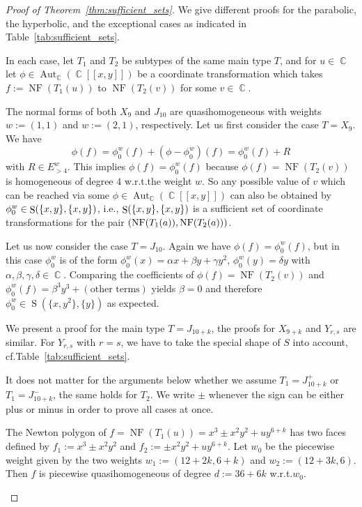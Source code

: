 \documentclass{amsproc}
\theoremstyle{definition}
\let\originalleft\left
\let\originalright\right
\renewcommand{\left}{\mathopen{}\mathclose\bgroup\originalleft}
\renewcommand{\right}{\aftergroup\egroup\originalright}
\DeclareMathOperator{\C}{\mathbb{C}}
\DeclareMathOperator{\NF}{NF}
\DeclareMathOperator{\s}{S}
\DeclareMathOperator{\Aut}{Aut}
\begin{document}
\begin{proof}[Proof of Theorem~\ref{thm:sufficient_sets}]
We give different proofs for the parabolic, the hyperbolic, and the exceptional
cases as indicated in Table~\ref{tab:sufficient_sets}.

In each case, let $T_1$ and $T_2$ be subtypes of the same main type $T$, and
for $u \in \C$ let $\phi \in \Aut_{\C}(\C[[x,y]])$ be a coordinate
transformation which takes $f := \NF(T_1(u))$ to $\NF(T_2(v))$ for some
$v \in \C$.

\begin{description}[font=\normalfont\itshape,%
leftmargin=0cm,labelindent=\parindent]

\item[Parabolic cases]
The normal forms of both $X_9$ and $J_{10}$ are
quasihomogeneous with weights $w := (1,1)$ and $w := (2,1)$, respectively. Let
us first consider the case $T = X_9$. We have
\[
\phi(f) = \phi_0^w(f)+(\phi-\phi_0^w)(f) = \phi_0^w(f)+R
\]
with $R \in E_{>4}^w$. This implies $\phi(f) = \phi_0^w(f)$ because
$\phi(f) = \NF(T_2(v))$ is homogeneous of degree $4$ w.r.t.\@ the weight $w$.
So any possible value of $v$ which can be reached via some
$\phi \in \Aut_{\C}(\C[[x,y]])$ can also be obtained by
$\phi_0^w \in \s\left(\{x,y\}, \{x,y\}\right)$, i.e.\@,
$\s\left(\{x,y\}, \{x,y\}\right)$ is a sufficient set of coordinate
transformations for the pair $\left(\NF(T_1(a)), \NF(T_2(a))\right)$.

Let us now consider the case $T = J_{10}$.
Again we have $\phi(f) = \phi_0^w(f)$, but
in this case
$\phi_0^w$ is of the form
$\phi_0^w(x) = \alpha x + \beta y + \gamma y^2$,
$\phi_0^w(y) = \delta y$ with
$\alpha, \beta, \gamma, \delta \in \C$. Comparing the coefficients of
$\phi(f) = \NF(T_2(v))$ and
$\phi_0^w(f) = \beta^3 y^3 + (\text{other terms})$ yields
$\beta = 0$ and therefore $\phi_0^w \in \s(\{x, y^2\}, \{y\})$
as expected.

\item[Hyperbolic cases]
We present a proof for the main type $T = J_{10+k}$, the proofs for $X_{9+k}$
and $Y_{r,s}$ are similar. For $Y_{r,s}$ with $r = s$, we have to take the
special shape of $S$ into account, cf.\@ Table~\ref{tab:sufficient_sets}.

It does not matter for the arguments below whether we assume $T_1 = J_{10+k}^+$
or $T_1 = J_{10+k}^-$, the same holds for $T_2$. We write $\pm$ whenever the
sign can be either plus or minus in order to prove all cases at once.

The Newton polygon of $f = \NF(T_1(u)) = x^3 \pm x^2 y^2 + uy^{6+k}$ has two
faces defined by $f_1 := x^3 \pm x^2 y^2$ and $f_2 := \pm x^2 y^2 + uy^{6+k}$.
Let $w_0$ be the piecewise weight given by the two weights
$w_1 := (12+2k, 6+k)$ and $w_2 := (12+3k, 6)$. Then $f$ is piecewise
quasihomogeneous of degree $d := 36+6k$ w.r.t.\@ $w_0$.


\end{description}
\end{proof}
\end{document}
